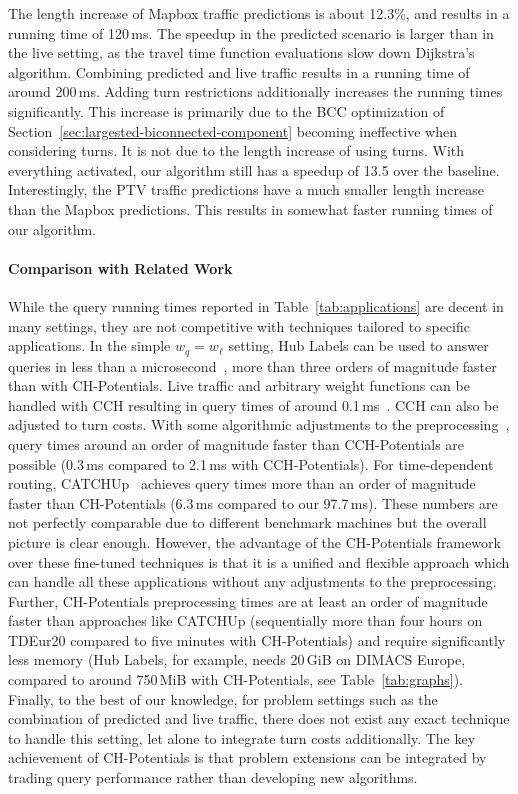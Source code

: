 \documentclass[manuscript]{acmart}
\begin{document}
The length increase of Mapbox traffic predictions is about 12.3\%, and results in a running time of 120\,ms.
The speedup in the predicted scenario is larger than in the live setting, as the travel time function evaluations slow down Dijkstra's algorithm.
Combining predicted and live traffic results in a running time of around 200\,ms.
Adding turn restrictions additionally increases the running times significantly.
This increase is primarily due to the BCC optimization of Section~\ref{sec:largested-biconnected-component} becoming ineffective when considering turns.
It is not due to the length increase of using turns.
With everything activated, our algorithm still has a speedup of 13.5 over the baseline.
Interestingly, the PTV traffic predictions have a much smaller length increase than the Mapbox predictions.
This results in somewhat faster running times of our algorithm.

\paragraph{Comparison with Related Work}

While the query running times reported in Table~\ref{tab:applications} are decent in many settings, they are not competitive with techniques tailored to specific applications.
In the simple $w_q = w_{\ell}$ setting, Hub Labels can be used to answer queries in less than a microsecond~\cite{DBLP:conf/wea/DellingGW13}, more than three orders of magnitude faster than with CH-Potentials.
Live traffic and arbitrary weight functions can be handled with CCH resulting in query times of around 0.1\,ms~\cite{DBLP:journals/jea/Buchhold0W19}.
CCH can also be adjusted to turn costs.
With some algorithmic adjustments to the preprocessing~\cite{bwzz-cchtc-20}, query times around an order of magnitude faster than CCH-Potentials are possible (0.3\,ms compared to 2.1\,ms with CCH-Potentials).
For time-dependent routing, CATCHUp~\cite{swz-sfert-21} achieves query times more than an order of magnitude faster than CH-Potentials (6.3\,ms compared to our 97.7\,ms).
These numbers are not perfectly comparable due to different benchmark machines but the overall picture is clear enough.
However, the advantage of the CH-Potentials framework over these fine-tuned techniques is that it is a unified and flexible approach which can handle all these applications without any adjustments to the preprocessing.
Further, CH-Potentials preprocessing times are at least an order of magnitude faster than approaches like CATCHUp (sequentially more than four hours on TDEur20 compared to five minutes with CH-Potentials) and require significantly less memory (Hub Labels, for example, needs 20\,GiB on DIMACS Europe, compared to around 750\,MiB with CH-Potentials, see Table~\ref{tab:graphs}).
Finally, to the best of our knowledge, for problem settings such as the combination of predicted and live traffic, there does not exist any exact technique to handle this setting, let alone to integrate turn costs additionally.
The key achievement of CH-Potentials is that problem extensions can be integrated by trading query performance rather than developing new algorithms.
\end{document}
